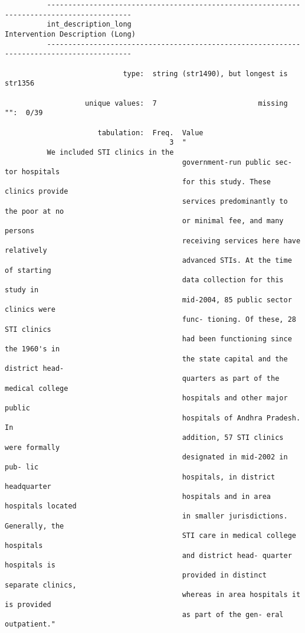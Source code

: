 \documentclass{article}
\begin{document}
\begin{verbatim}
          ------------------------------------------------------------------------------------------
          int_description_long                                       Intervention Description (Long)
          ------------------------------------------------------------------------------------------
          
                            type:  string (str1490), but longest is str1356
          
                   unique values:  7                        missing "":  0/39
          
                      tabulation:  Freq.  Value
                                       3  "
          We included STI clinics in the
                                          government-run public sec- tor hospitals
                                          for this study. These clinics provide
                                          services predominantly to the poor at no
                                          or minimal fee, and many persons
                                          receiving services here have relatively
                                          advanced STIs. At the time of starting
                                          data collection for this study in
                                          mid-2004, 85 public sector clinics were
                                          func- tioning. Of these, 28 STI clinics
                                          had been functioning since the 1960's in
                                          the state capital and the district head-
                                          quarters as part of the medical college
                                          hospitals and other major public
                                          hospitals of Andhra Pradesh. In
                                          addition, 57 STI clinics were formally
                                          designated in mid-2002 in pub- lic
                                          hospitals, in district headquarter
                                          hospitals and in area hospitals located
                                          in smaller jurisdictions. Generally, the
                                          STI care in medical college hospitals
                                          and district head- quarter hospitals is
                                          provided in distinct separate clinics,
                                          whereas in area hospitals it is provided
                                          as part of the gen- eral outpatient."

\end{verbatim}
\end{document}
